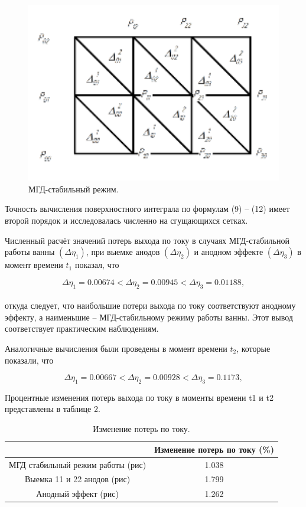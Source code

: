 \documentclass{article}
\begin{document}
\begin{figure}[H]
    \centering
    \includegraphics[width=150mm]{triangul.png}
    \caption{МГД-стабильный режим.}
    \label{fig:triangels} 
\end{figure}

Точность вычисления поверхностного интеграла по формулам (9) – (12) имеет второй порядок и исследовалась численно на сгущающихся сетках.

Численный расчёт значений потерь выхода по току в случаях МГД-стабильной работы ванны $(\Delta\eta_1)$, при выемке анодов $(\Delta\eta_2)$ и анодном эффекте $(\Delta\eta_3)$ в момент времени $t_1$ показал, что 

\[ \Delta\eta_1 = 0.00674 < \Delta\eta_2 = 0.00945 < \Delta\eta_3 = 0.01188, \]
\\
откуда следует, что наибольшие потери выхода по току соответствуют анодному эффекту, а наименьшие – МГД-стабильному режиму работы ванны. Этот вывод соответствует практическим наблюдениям.

Аналогичные вычисления были проведены в момент времени $t_2$, которые показали, что

\[ \Delta\eta_1 = 0.00667 < \Delta\eta_2 = 0.00928 < \Delta\eta_3 = 0.1173, \]

Процентные изменения потерь выхода по току в моменты времени t1 и t2 представлены в таблице 2. 


\begin{table}[H]
\centering
\begin{tabular}{|c|c|}
\hline
			& Изменение потерь по току (\%)\\
\hline
МГД стабильный режим работы (рис) & 1.038	\\
\hline
Выемка 11 и 22 анодов (рис) &	1.799\\
\hline
Анодный эффект (рис) & 1.262	\\
\hline
\end{tabular}
\caption{Изменение потерь по току. \label{table:ismineniep}}
\end{table}
\end{document}
